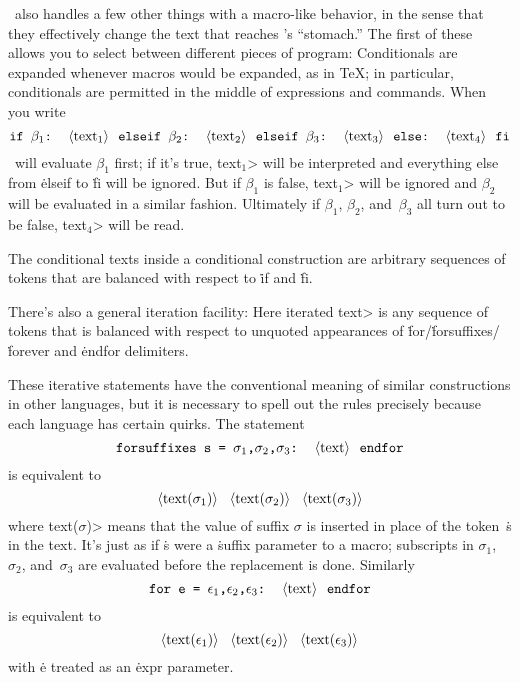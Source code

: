 \MF\ also handles a few other things with a macro-like behavior, in the
sense that they effectively change the text that reaches \MF's ``stomach.''
The first of these allows you to select between different pieces of program:
Conditionals are expanded whenever macros would be expanded, as in \TeX;
in particular, conditionals are permitted in the middle of expressions and
commands. When you write
$$\hbox{\tt if $\beta_1$: \<text$_1$> elseif $\beta_2$: \<text$_2$>
  elseif $\beta_3$: \<text$_3$> else: \<text$_4$> fi}$$
\MF\ will evaluate $\beta_1$ first; if it's true, \<text$_1$> will be
interpreted and everything else from \.{elseif} to \.{fi} will be ignored.
But if $\beta_1$ is false, \<text$_1$> will be ignored and $\beta_2$
will be evaluated in a similar fashion. Ultimately if $\beta_1$, $\beta_2$,
and~$\beta_3$ all turn out to be false, \<text$_4$> will be read.

The conditional texts inside a conditional construction are arbitrary
sequences of tokens that are balanced with respect to \.{if} and \.{fi}.

There's also a general iteration facility:
Here \<iterated text> is any sequence of tokens that is balanced with
respect to unquoted appearances of \.{for}/\.{forsuffixes}/\.{forever}
and \.{endfor} delimiters.

These iterative statements have the conventional meaning of similar
constructions in other languages, but it is necessary to spell out the
rules precisely because each language has certain quirks. The statement
$$\hbox{\tt forsuffixes s = $\sigma_1$,$\sigma_2$,$\sigma_3$:
  \<text> endfor}$$
is equivalent to
$$\hbox{\tt \<text($\sigma_1$)> \<text($\sigma_2$)> \<text($\sigma_3$)>}$$
where \<text($\sigma$)> means that the value of suffix $\sigma$ is inserted
in place of the token~\.s in the text. It's just as if \.s were a \.{suffix}
parameter to a macro; subscripts in $\sigma_1$, $\sigma_2$, and~$\sigma_3$
are evaluated before the replacement is done. Similarly
$$\hbox{\tt for e = $\epsilon_1$,$\epsilon_2$,$\epsilon_3$: \<text> endfor}$$
is equivalent to
$$\hbox{\tt \<text($\epsilon_1$)> \<text($\epsilon_2$)>
  \<text($\epsilon_3$)>}$$
with \.e treated as an \.{expr} parameter.

